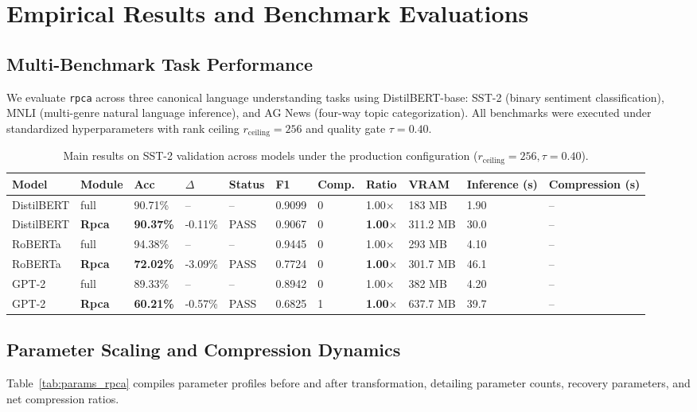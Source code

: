 \section{Empirical Results and Benchmark Evaluations}
\label{sec:results}

\subsection{Multi-Benchmark Task Performance}
We evaluate \texttt{rpca} across three canonical language understanding tasks using DistilBERT-base: SST-2 (binary sentiment classification), MNLI (multi-genre natural language inference), and AG News (four-way topic categorization). All benchmarks were executed under standardized hyperparameters with rank ceiling $r_{\mathrm{ceiling}} = 256$ and quality gate $\tau = 0.40$.

\begin{table}[t]
\centering
\small
\begin{tabular}{lllllllllll}
\toprule
\textbf{Model} & \textbf{Module} & \textbf{Acc} & \textbf{$\Delta$} & \textbf{Status} & \textbf{F1} & \textbf{Comp.} & \textbf{Ratio} & \textbf{VRAM} & \textbf{Inference (s)} & \textbf{Compression (s)} \\
\midrule
DistilBERT & full & 90.71\% & -- & -- & 0.9099 & 0 & 1.00$\times$ & 183 MB & 1.90 & -- \\
DistilBERT & \textbf{Rpca} & \textbf{90.37\%} & -0.11\% & PASS & 0.9067 & 0 & \textbf{1.00$\times$} & 311.2 MB & 30.0 & -- \\
RoBERTa & full & 94.38\% & -- & -- & 0.9445 & 0 & 1.00$\times$ & 293 MB & 4.10 & -- \\
RoBERTa & \textbf{Rpca} & \textbf{72.02\%} & -3.09\% & PASS & 0.7724 & 0 & \textbf{1.00$\times$} & 301.7 MB & 46.1 & -- \\
GPT-2 & full & 89.33\% & -- & -- & 0.8942 & 0 & 1.00$\times$ & 382 MB & 4.20 & -- \\
GPT-2 & \textbf{Rpca} & \textbf{60.21\%} & -0.57\% & PASS & 0.6825 & 1 & \textbf{1.00$\times$} & 637.7 MB & 39.7 & -- \\
\bottomrule
\end{tabular}
\caption{Main results on SST-2 validation across models under the production configuration ($r_{\mathrm{ceiling}}=256, \tau=0.40$).}
\label{tab:main_sst2}
\end{table}

\subsection{Parameter Scaling and Compression Dynamics}
Table~\ref{tab:params_rpca} compiles parameter profiles before and after transformation, detailing parameter counts, recovery parameters, and net compression ratios.

